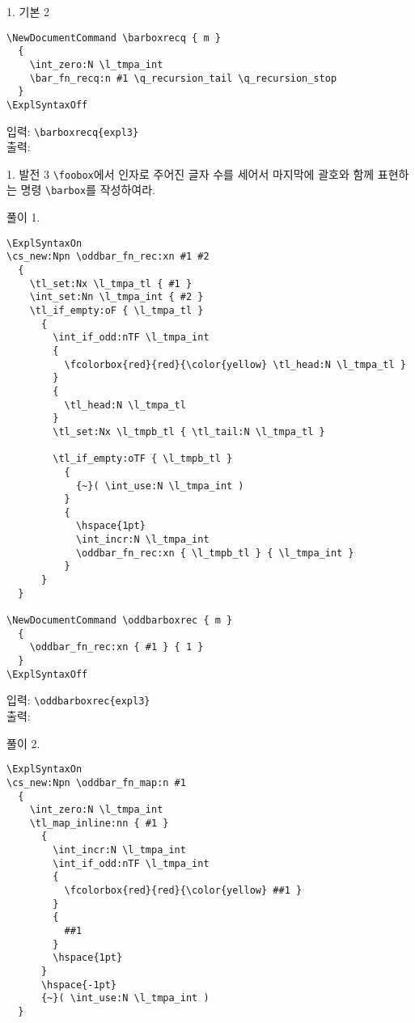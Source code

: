 \documentclass[a4paper,amsmath,itemph]{oblivoir}
\begin{document}
\begin{questionp}{1. 기본 2}
\begin{verbatim}
\NewDocumentCommand \barboxrecq { m }
  {
    \int_zero:N \l_tmpa_int
    \bar_fn_recq:n #1 \q_recursion_tail \q_recursion_stop
  }
\ExplSyntaxOff
  \end{verbatim}

  \begin{tcolorbox}{}
    입력: \verb|\barboxrecq{expl3}|\\
    출력: 
  \end{tcolorbox}
\end{questionp}

\begin{questionp}{1. 발전 3}
  \verb|\foobox|에서 인자로 주어진 글자 수를 세어서 마지막에 괄호와 함께
  표현하는 명령 \verb|\barbox|를 작성하여라.

  \tcblower

  풀이 1.
  \begin{verbatim}
\ExplSyntaxOn
\cs_new:Npn \oddbar_fn_rec:xn #1 #2
  {
    \tl_set:Nx \l_tmpa_tl { #1 }
    \int_set:Nn \l_tmpa_int { #2 }
    \tl_if_empty:oF { \l_tmpa_tl }
      {
        \int_if_odd:nTF \l_tmpa_int
        {
          \fcolorbox{red}{red}{\color{yellow} \tl_head:N \l_tmpa_tl }
        }
        {
          \tl_head:N \l_tmpa_tl
        }
        \tl_set:Nx \l_tmpb_tl { \tl_tail:N \l_tmpa_tl }

        \tl_if_empty:oTF { \l_tmpb_tl }
          {
            {~}( \int_use:N \l_tmpa_int )
          }
          {
            \hspace{1pt}
            \int_incr:N \l_tmpa_int
            \oddbar_fn_rec:xn { \l_tmpb_tl } { \l_tmpa_int }
          }
      }
  }

\NewDocumentCommand \oddbarboxrec { m }
  {
    \oddbar_fn_rec:xn { #1 } { 1 }
  }
\ExplSyntaxOff
  \end{verbatim}

  \begin{tcolorbox}{}
    입력: \verb|\oddbarboxrec{expl3}|\\
    출력: 
  \end{tcolorbox}

  풀이 2.
  
  \begin{verbatim}
\ExplSyntaxOn
\cs_new:Npn \oddbar_fn_map:n #1
  {
    \int_zero:N \l_tmpa_int
    \tl_map_inline:nn { #1 }
      {
        \int_incr:N \l_tmpa_int
        \int_if_odd:nTF \l_tmpa_int
        {
          \fcolorbox{red}{red}{\color{yellow} ##1 }
        }
        {
          ##1
        }
        \hspace{1pt}
      }
      \hspace{-1pt}
      {~}( \int_use:N \l_tmpa_int )
  }


\end{verbatim}
\end{questionp}
\end{document}
